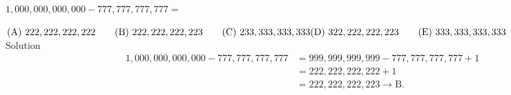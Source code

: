 

$1,000,000,000,000-777,777,777,777=$

$\text{(A)}\ 222,222,222,222 \qquad  \text{(B)}\ 222,222,222,223 \qquad  \text{(C)}\ 233,333,333,333 \qquad \\ \text{(D)}\ 322,222,222,223 \qquad  \text{(E)}\ 333,333,333,333$
\\
Solution
\\
\begin{align*} 1,000,000,000,000-777,777,777,777 &= 999,999,999,999-777,777,777,777+1 \\ &= 222,222,222,222+1 \\ &= 222,222,222,223 \rightarrow \boxed{\text{B}}. \end{align*}
